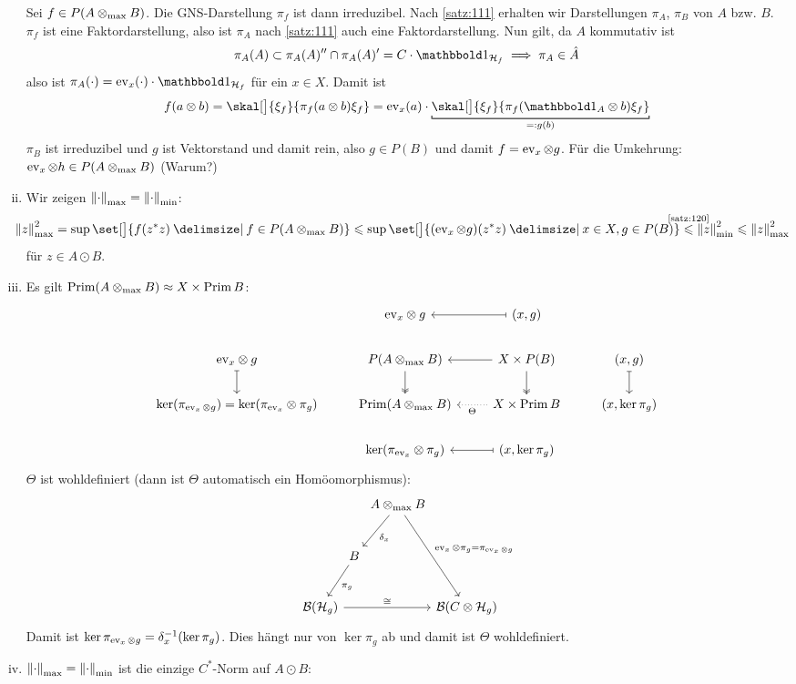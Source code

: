 \begin{beweis}
\begin{enumerate}[(i)]
		Sei $f \in P(A \tensormax B)$.
		Die GNS-Darstellung $\pi_f$ ist dann irreduzibel.
		Nach \autoref{satz:111} erhalten wir Darstellungen $\pi_A$, $\pi_B$ von $A$ bzw. $B$.
		$\pi_f$ ist eine Faktordarstellung, also ist $\pi_A$ nach \autoref{satz:111} auch eine Faktordarstellung.
		Nun gilt, da $A$ kommutativ ist
		\[
			\pi_A(A) \subset \pi_A(A)'' \cap \pi_A(A)'= C \cdot \ind_{\mathcal{H}_f} \implies \pi_A \in \hat{A}
 		\]
		also ist $\pi_A(\cdot ) = \ev_x(\cdot) \cdot \ind_{\mathcal{H}_f}$ für ein $x \in X$.
		Damit ist 
		\[
			f(a \otimes b) = \skal[\big]{\xi_f}{\pi_f(a \otimes b) \xi_f} = \ev_x(a) \cdot \Underbracket{\skal[\big]{\xi_f}{\pi_f(\ind_A \otimes b) \xi_f}}{=: g(b)}
		\]
		$\pi_B$ ist irreduzibel und $g$ ist Vektorstand und damit rein, also $g \in P(B)$ und damit $f= \ev_x \otimes g$.
		Für die Umkehrung: $\ev_x \otimes h \in P(A \tensormax B)$ (Warum?)
		\item Wir zeigen $\norm*{\cdot }_{\max} = \norm*{\cdot }_{\min}$:
		\[
			\hspace{-1em}\norm*{z}^2_{\max} = \sup \set[\big]{f(z^*z) \given f \in P(A \tensormax B)} \le \sup \set[\big]{(\ev_x \otimes g)(z^*z) \given x \in X, g \in P(B)} \StackTextClap{\ref{satz:120}}{\le} \norm*{z}_{\min}^2 \le \norm*{z}_{\max}^2
		\]
		für $z \in A \odot B$.
		\item Es gilt $\Prim(A \tensormax B) \approx X \times \Prim B$:
		\[
			\begin{tikzcd}
				& {\ev_x} \otimes g & (x,g) \lar[mapsto] \\
				{\ev_x} \otimes g \dar[mapsto] & P(A \tensormax B) \dar[two heads]& X\times P(B) \lar \dar[two heads] & (x,g) \dar[mapsto] \\
				\ker(\pi_{\ev_x \otimes g}) = \ker(\pi_{\ev_x} \otimes \pi_g) & \Prim(A \tensormax B) & X \times \Prim B \lar[dotted,"\Theta"] & (x, \ker \pi_g) \\
				& \ker (\pi_{\ev_x} \otimes \pi_g) & (x, \ker \pi_g) \lar[mapsto]
			\end{tikzcd}
		\]
		$\Theta$ ist wohldefiniert (dann ist $\Theta$ automatisch ein Homöomorphismus):
		\[
			\begin{tikzcd}[column sep=0pt,row sep=2.5em]
				& & A \tensormax B \dlar["\delta_x"] \ar[ddrr,"\ev_x \otimes \pi_g = \pi_{\ev_x \otimes g}"]\\
				& B \dlar["\pi_g"] \\
				\mathcal{B}(\mathcal{H}_g) \ar[rrrr,"\cong"] & & & & \mathcal{B} \enbrace*{C \otimes \mathcal{H}_g}
			\end{tikzcd}
		\]
		Damit ist $\ker \pi_{\ev_x \otimes g} = \delta^{-1}_x (\ker \pi_g)$.
		Dies hängt nur von $\ker \pi_g$ ab und damit ist $\Theta$ wohldefiniert.
		\item $\norm*{\cdot}_{\max}=\norm*{\cdot}_{\min}$ ist die einzige $C^*$-Norm auf $A \odot B$:
        

\end{enumerate}
\end{beweis}
